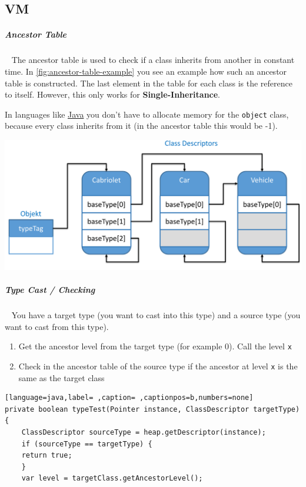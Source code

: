 \documentclass[12pt,twoside,landscape]{extarticle}
\begin{document}
\begin{multicols}{4}
\section{VM}
\label{sec:org64ebcae}
\subparagraph{Ancestor Table} \
\label{sec:org470da50}
The ancestor table is used to check if a class inherits from another in constant time.
In \autoref{fig:ancestor-table-example} you see an example how such an ancestor table is constructed.
The last element in the table for each class is the reference to itself.
However, this only works for \textbf{Single-Inheritance}.

In languages like \href{../../../roam/20201116150053-java.org}{Java} you don't have to allocate memory for the \texttt{object} class, because every class inherits from it (in the ancestor table this would be -1).

{
\begin{center}
\includegraphics[width=.9\linewidth]{img/ancestor_table.png}
\end{center}
\label{fig:ancestor-table-example}
}

\subparagraph{Type Cast / Checking} \
\label{sec:orga5c8e26}
You have a target type (you want to cast into this type) and a source type (you want to cast from this type).

\begin{enumerate}
\item Get the ancestor level from the target type (for example 0). Call the level \texttt{x}
\item Check in the ancestor table of the source type if the ancestor at level \texttt{x} is the same as the target class
\end{enumerate}


\begin{lstlisting}[language=java,label= ,caption= ,captionpos=b,numbers=none]
private boolean typeTest(Pointer instance, ClassDescriptor targetType) {
    ClassDescriptor sourceType = heap.getDescriptor(instance);
    if (sourceType == targetType) {
	return true;
    }
    var level = targetClass.getAncestorLevel();


\end{lstlisting}
\end{multicols}
\end{document}
